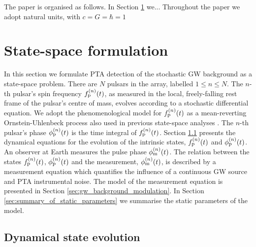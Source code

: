 \documentclass[fleqn,usenatbib,useAMS]{mnras}
\begin{document}
The paper is organised as follows. In Section \ref{sec:state_space_formulation} we... Throughout the paper we adopt natural units, with $c = G = \hbar =1 $












\section{State-space formulation}\label{sec:state_space_formulation}
In this section we formulate PTA detection of the stochastic GW background as a state-space problem. There are $N$ pulsars in the array, labelled $1\leq n\leq N$.  The $n$-th pulsar’s spin frequency $f_{\rm p}^{(n)}(t)$, as measured in the local, freely-falling rest frame of the pulsar’s centre of mass, evolves according to a stochastic differential equation. We adopt the phenomenological model for $f_{\rm p}^{(n)}(t)$ as a mean-reverting Ornstein-Uhlenbeck process also used in previous state-space analyses \citep{Vargas, KimpsonPTA1, KimpsonPTA2}. The $n$-th pulsar’s phase $\phi_{\rm p}^{(n)}(t)$ is the time integral of $f_{\rm p}^{(n)}(t)$. Section \ref{sec:spin_evolution} presents the dynamical equations for the evolution of the intrinsic states, $f_{\rm p}^{(n)}(t)$ and $\phi_{\rm p}^{(n)}(t)$. An observer at Earth measures the pulse phase  $\phi_{\rm m}^{(n)}(t)$. The relation between the states $f_{\rm p}^{(n)}(t)$, $\phi_{\rm p}^{(n)}(t)$ and the measurement, $\phi_{\rm m}^{(n)}(t)$, is described by a measurement equation which quantifies the influence of a continuous GW source and PTA instrumental noise. The model of the measurement equation is presented in Section \ref{sec:gw_background_modulation}. In Section \ref{sec:summary_of_static_parameters} we summarise the static parameters of the model. 





\subsection{Dynamical state evolution}\label{sec:spin_evolution}
\end{document}
